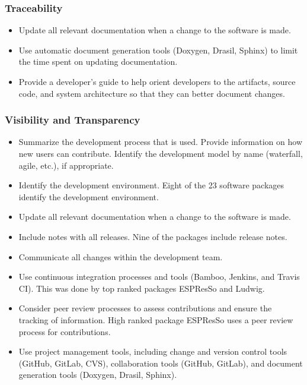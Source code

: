 \documentclass[12pt, notitlepage]{article}
\begin{document}
\subsubsection{Traceability}

\begin{itemize}
	\item Update all relevant documentation when a change to the software is made.
	\item Use automatic document generation tools (Doxygen, Drasil, Sphinx) to limit the time spent on updating documentation.
	\item Provide a developer's guide to help orient developers to the artifacts, source code, and system architecture so that they can better document changes.  
\end{itemize}

\subsubsection{Visibility and Transparency}

\begin{itemize}
	\item Summarize the development process that is used. Provide information on how new users can contribute. Identify the development model by name (waterfall, agile, etc.), if appropriate.
	\item Identify the development environment. Eight of the 23 software packages identify the development environment.
	\item Update all relevant documentation when a change to the software is made.
	\item Include notes with all releases. Nine of the packages include release notes.
	\item Communicate all changes within the development team.
	\item Use continuous integration processes and tools (Bamboo, Jenkins, and Travis CI). This was done by top ranked packages ESPResSo and Ludwig.
	\item Consider peer review processes to assess contributions and ensure the tracking of information. High ranked package ESPResSo uses a peer review process for contributions. 
	\item Use project management tools, including change and version control tools (GitHub, GitLab, CVS), collaboration tools (GitHub, GitLab), and document generation tools (Doxygen, Drasil, Sphinx).
\end{itemize}
\end{document}
